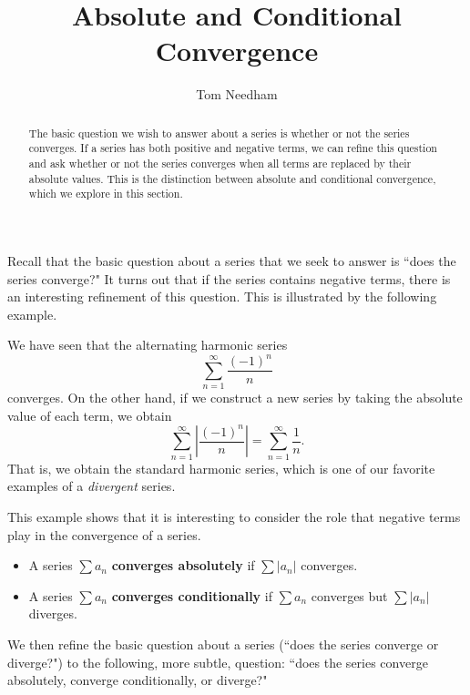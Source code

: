 \documentclass{ximera}
\author{Tom Needham}
\title[Dig-In:]{Absolute and Conditional Convergence}
\begin{document}
\begin{abstract}
The basic question we wish to answer about a series is whether or not the series converges. If a series has both positive and negative terms, we can refine this question and ask whether or not the series converges when all terms are replaced by their absolute values. This is the distinction between absolute and conditional convergence, which we explore in this section.
\end{abstract}
\maketitle


Recall that the basic question about a series that we seek to answer is ``does the series converge?" It turns out that if the series contains negative terms, there is an interesting refinement of this question. This is illustrated by the following example. 

\begin{example}
We have seen that the alternating harmonic series 
$$
\sum_{n=1}^\infty \frac{(-1)^n}{n}
$$
converges. On the other hand, if we construct a new series by taking the absolute value of each term, we obtain
$$
\sum_{n=1}^\infty \left| \frac{(-1)^n}{n} \right| = \sum_{n=1}^\infty \frac{1}{n}.
$$
That is, we obtain the standard harmonic series, which is one of our favorite examples of a \emph{divergent} series.
\end{example}

This example shows that it is interesting to consider the role that negative terms play in the convergence of a series. 

\begin{definition}\hfil
\begin{itemize}
\item A series $\sum  a_n$ \textbf{converges absolutely} if $\sum  |a_n|$ converges.
\item A series $\sum  a_n$ \textbf{converges conditionally} if $\sum  a_n$ converges but $\sum  |a_n|$ diverges.
\end{itemize}
\end{definition}

We then refine the basic question about a series (``does the series converge or diverge?") to the following, more subtle, question: ``does the series converge absolutely, converge conditionally, or diverge?"
\end{document}
